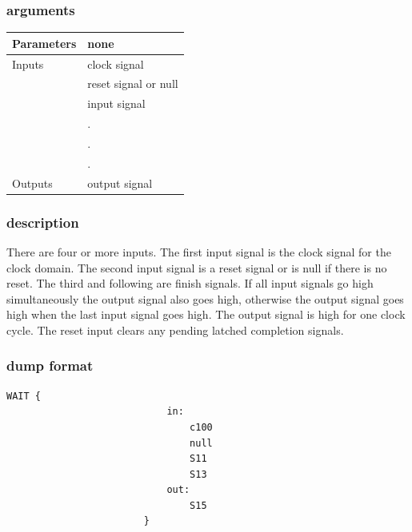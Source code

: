 \documentclass[10pt,a4paper,twoside,fleqn]{book}
\begin{document}
                \subsubsection{arguments}

                    \begin{tabular}{| l | l |}
                    \hline
                    Parameters  & none \\
                    \hline
                    Inputs      & clock signal \\
                                & reset signal or null \\
                                & input signal \\
                                & . \\
                                & . \\
                                & . \\
                    \hline
                    Outputs     & output signal \\
                    \hline
                    \end{tabular}

                \subsubsection{description}

                    There are four or more inputs. The first input signal is the
                    clock signal for the clock domain. The second input signal is a
                    reset signal or is null if there is no reset. The third and
                    following are finish signals. If all input signals go high
                    simultaneously the output signal also goes high, otherwise the
                    output signal goes high when the last input signal goes high.
                    The output signal is high for one clock cycle. The reset input
                    clears any pending latched completion signals.

                \subsubsection{dump format}

                    \begin{lstlisting}[gobble=20, language=tde]
                        WAIT {
                            in:
                                c100
                                null
                                S11
                                S13
                            out:
                                S15
                        }
                    \end{lstlisting}
\end{document}
